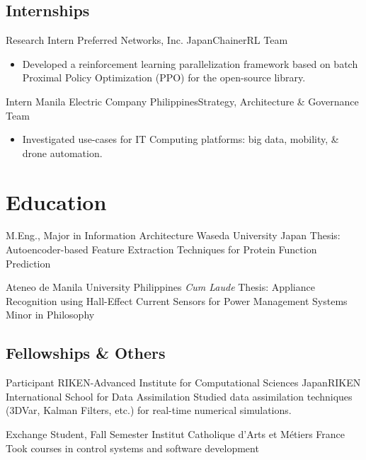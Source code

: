 \documentclass[12pt,a4paper]{moderncv}
\begin{document}
\subsection{Internships}
{Research Intern}
{Preferred Networks, Inc.}
{Japan}{ChainerRL Team}
{
    \begin{itemize}
        \item Developed a reinforcement learning parallelization framework
            based on batch Proximal Policy Optimization (PPO) for the
            open-source
            {\color{blue}}
            library.
    \end{itemize}
}

{Intern}
{Manila Electric Company}
{Philippines}{Strategy, Architecture \& Governance Team}
{
    \begin{itemize}
        \item Investigated use-cases for IT Computing platforms: big
              data, mobility, \& drone automation.
    \end{itemize}
}


\section{Education}
{M.Eng., Major in Information Architecture}
{Waseda University}
{Japan}{}
{Thesis: Autoencoder-based Feature Extraction Techniques for Protein
    Function Prediction}

{Ateneo de Manila University}
{Philippines}
{\textit{Cum Laude}}
{
    Thesis: Appliance Recognition using Hall-Effect Current Sensors for
    Power Management Systems\\
    Minor in Philosophy
}


\subsection{Fellowships \& Others}

{Participant}
{RIKEN-Advanced Institute for Computational Sciences}
{Japan}{RIKEN International School for Data Assimilation}
{Studied data assimilation techniques (3DVar, Kalman Filters, etc.) for real-time numerical simulations.}

{Exchange Student, Fall Semester}
{Institut Catholique d'Arts et M\'etiers}
{France}{}
{Took courses in control systems and software development}
\end{document}
